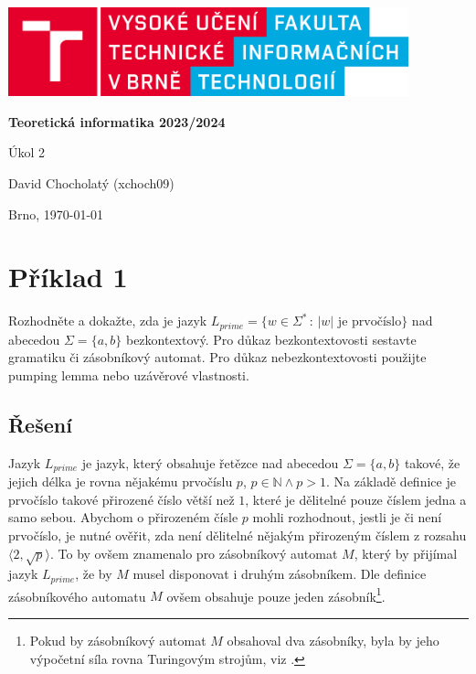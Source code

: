 \documentclass[a4paper, 12pt]{article}
\theoremstyle{definition}
\theoremstyle{definition}
\theoremstyle{definition}
\theoremstyle{remark}
\begin{document}
    \begin{titlepage}
        \begin{center}
            \includegraphics[width=0.87\textwidth]{logo_cz.png}
            \vspace*{6cm}

            \Huge{\textbf{Teoretická informatika 2023/2024}}
            \vspace{0.5cm}
            
            \LARGE{Úkol 2}
            \vspace{1cm}
            
            \Large{David Chocholatý (xchoch09)}
            
           \vfill
		   \begin{flushright} 
		   Brno, \today
		   \end{flushright}
        \end{center}
    \end{titlepage}

\pagestyle{fancy}

\section{Příklad 1}
Rozhodněte a dokažte, zda je jazyk $L_{prime} = \{w \in \Sigma^\ast \, : \, |w| \text{ je prvočíslo}\}$ nad abecedou $\Sigma = \{a, b\}$ bezkontextový. Pro důkaz bezkontextovosti sestavte gramatiku či zásobníkový automat. Pro důkaz nebezkontextovosti použijte pumping lemma nebo uzávěrové vlastnosti.

\subsection{Řešení}
Jazyk $L_{prime}$ je jazyk, který obsahuje řetězce nad abecedou $\Sigma = \{a, b\}$ takové, že jejich délka je rovna nějakému prvočíslu $p$, $p \in \mathbb{N} \wedge p > 1$. Na základě definice je prvočíslo takové přirozené číslo větší než $1$, které je dělitelné pouze číslem jedna a samo sebou. Abychom o přirozeném čísle $p$ mohli rozhodnout, jestli je či není prvočíslo, je nutné ověřit, zda není dělitelné nějakým přirozeným číslem z rozsahu $\langle 2, \sqrt{p}\rangle$. To by ovšem znamenalo pro zásobníkový automat $M$, který by přijímal jazyk $L_{prime}$, že by $M$ musel disponovat i druhým zásobníkem. Dle definice zásobníkového automatu $M$ ovšem obsahuje pouze jeden zásobník\footnote{Pokud by zásobníkový automat $M$ obsahoval dva zásobníky, byla by jeho výpočetní síla rovna Turingovým strojům, viz \cite{book}.}.
\end{document}
